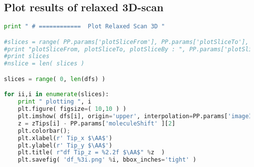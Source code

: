 \subsection{Plot results of relaxed 3D-scan}
\begin{shadedbox}
    \begin{lstlisting}[language=python]
print " # ============  Plot Relaxed Scan 3D "

#slices = range( PP.params['plotSliceFrom'], PP.params['plotSliceTo'], PP.params['plotSliceBy'] )
#print "plotSliceFrom, plotSliceTo, plotSliceBy : ", PP.params['plotSliceFrom'], PP.params['plotSliceTo'], PP.params['plotSliceBy']
#print slices 
#nslice = len( slices )

slices = range( 0, len(dfs) )

for ii,i in enumerate(slices):
    print " plotting ", i
    plt.figure( figsize=( 10,10 ) )
    plt.imshow( dfs[i], origin='upper', interpolation=PP.params['imageInterpolation'], cmap=PP.params['colorscale'], extent=extent )
    z = zTips[i] - PP.params['moleculeShift' ][2]
    plt.colorbar();
    plt.xlabel(r' Tip_x $\AA$')
    plt.ylabel(r' Tip_y $\AA$')
    plt.title( r"df Tip_z = %2.2f $\AA$" %z  )
    plt.savefig( 'df_%3i.png' %i, bbox_inches='tight' )

    \end{lstlisting}
\end{shadedbox}


